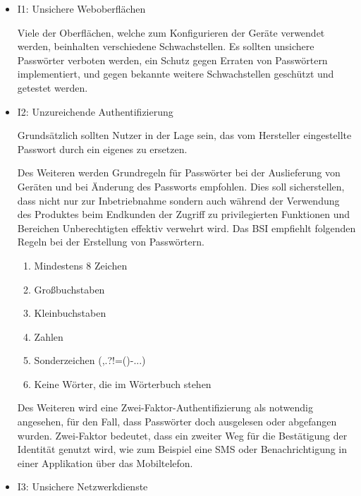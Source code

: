         \begin{itemize}
            \item I1: Unsichere Weboberflächen
            
            Viele der Oberflächen, welche zum Konfigurieren der Geräte verwendet werden, beinhalten verschiedene Schwachstellen.
            Es sollten unsichere Passwörter verboten werden, ein Schutz gegen Erraten von Passwörtern implementiert, und gegen bekannte weitere Schwachstellen geschützt und getestet werden.
            
            \item I2: Unzureichende Authentifizierung
            
            Grundsätzlich sollten Nutzer in der Lage sein, das vom Hersteller eingestellte Passwort durch ein eigenes zu ersetzen.
            
            Des Weiteren werden Grundregeln für Passwörter bei der Auslieferung von Geräten und bei Änderung des Passworts empfohlen. Dies soll sicherstellen, dass nicht nur zur Inbetriebnahme sondern auch während der Verwendung des Produktes beim Endkunden der Zugriff zu privilegierten Funktionen und Bereichen Unberechtigten effektiv verwehrt wird. Das \ac{BSI} \cite{bundesamt_fuer_sicherheit_in_der_informationstechnik_2018} 
            empfiehlt folgenden Regeln bei der Erstellung von Passwörtern.
            \begin{enumerate}
                \item Mindestens 8 Zeichen
                \item Großbuchstaben
                \item Kleinbuchstaben
                \item Zahlen
                \item Sonderzeichen (,.?!=()-...)
                \item Keine Wörter, die im Wörterbuch stehen
            \end{enumerate}
            
            Des Weiteren wird eine Zwei-Faktor-Authentifizierung als notwendig angesehen, für den Fall, dass Passwörter doch ausgelesen oder abgefangen wurden. Zwei-Faktor bedeutet, dass ein zweiter Weg für die Bestätigung der Identität genutzt wird, wie zum Beispiel eine SMS oder Benachrichtigung in einer Applikation über das Mobiltelefon.
            
            \item I3: Unsichere Netzwerkdienste
            

\end{itemize}
